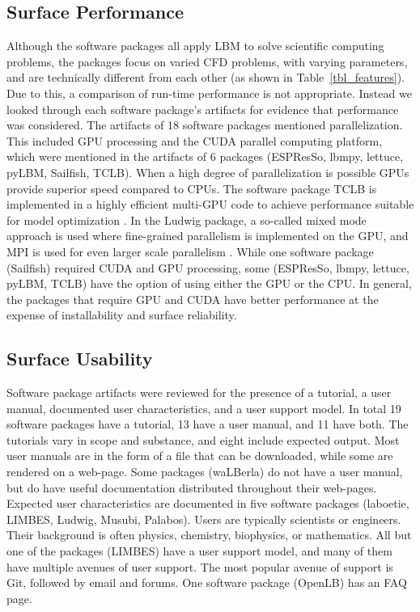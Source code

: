 \documentclass[final, 3p, times, authoryear]{elsarticle}
\begin{document}
\subsection{Surface Performance}

Although the software packages all apply LBM to solve scientific computing
problems, the packages focus on varied CFD problems, with varying parameters,
and are technically different from each other (as shown in
Table~\ref{tbl_features}). Due to this, a comparison of run-time performance is
not appropriate. Instead we looked through each software package's artifacts for
evidence that performance was considered. The artifacts of 18 software packages
mentioned parallelization. This included GPU processing and the CUDA parallel
computing platform, which were mentioned in the artifacts of 6 packages
(ESPResSo, lbmpy, lettuce, pyLBM, Sailfish, TCLB). When a high degree of
parallelization is possible GPUs provide superior speed compared to CPUs. The
software package TCLB is implemented in a highly efficient multi-GPU code to
achieve performance suitable for model optimization \citep{rutkowski2020open}.
In the Ludwig package, a so-called mixed mode approach is used where
fine-grained parallelism is implemented on the GPU, and MPI is used for even
larger scale parallelism \citep{gray2013ludwig}. While one software package
(Sailfish) required CUDA and GPU processing, some (ESPResSo, lbmpy, lettuce,
pyLBM, TCLB) have the option of using either the GPU or the CPU. In general, the
packages that require GPU and CUDA have better performance at the expense of
installability and surface reliability.

\subsection{Surface Usability}

Software package artifacts were reviewed for the presence of a tutorial, a user
manual, documented user characteristics, and a user support model. In total 19
software packages have a tutorial, 13 have a user manual, and 11 have both. The
tutorials vary in scope and substance, and eight include expected output. Most
user manuals are in the form of a file that can be downloaded, while some are
rendered on a web-page. Some packages (waLBerla) do not have a user manual, but
do have useful documentation distributed throughout their web-pages. Expected
user characteristics are documented in five software packages (laboetie, LIMBES,
Ludwig, Musubi, Palabos). Users are typically scientists or engineers. Their
background is often physics, chemistry, biophysics, or mathematics. All but one
of the packages (LIMBES) have a user support model, and many of them have
multiple avenues of user support. The most popular avenue of support is Git,
followed by email and forums. One software package (OpenLB) has an FAQ page.    
\end{document}
